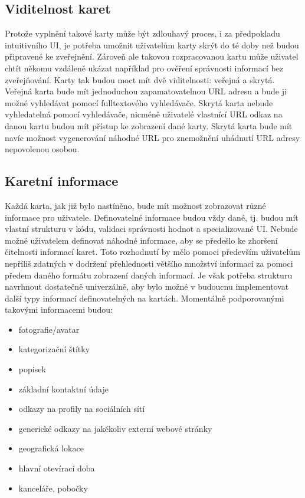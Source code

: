 	\subsection{Viditelnost karet}

	Protože vyplnění takové karty může být zdlouhavý proces, i za předpokladu intuitivního \ac{UI}, je potřeba umožnit
	uživatelům karty skrýt do té doby než budou připravené ke zveřejnění.
	Zároveň ale takovou rozpracovanou kartu může uživatel chtít někomu vzdáleně ukázat například pro ověření správnosti informací
	bez zveřejňování.
	Karty tak budou moct mít dvě viditelnosti: veřejná a skrytá.
	Veřejná karta bude mít jednoduchou zapamatovatelnou \ac{URL} adresu a bude ji možné vyhledávat pomocí fulltextového vyhledávače.
	Skrytá karta nebude vyhledatelná pomocí vyhledávače, nicméně uživatelé vlastnící \ac{URL} odkaz na danou kartu budou mít přístup
	ke zobrazení dané karty.
	Skrytá karta bude mít navíc možnost vygenerování náhodné \ac{URL} pro znemožnění uhádnutí \ac{URL} adresy nepovolenou osobou.

	\subsection{Karetní informace}

	Každá karta, jak již bylo nastíněno, bude mít možnost zobrazovat různé informace pro uživatele.
	Definovatelné informace budou vždy dané, tj. budou mít vlastní strukturu v kódu, validaci správnosti hodnot a specializované
	\ac{UI}.
	Nebude možné uživatelem definovat náhodné informace, aby se předešlo ke zhoršení čitelnosti informací karet.
	Toto rozhodnutí by mělo pomoci především uživatelům nepříliš zdatných v dodržení přehlednosti většího množství
	informací za pomoci předem daného formátu zobrazení daných informací.
	Je však potřeba strukturu navrhnout dostatečně univerzálně, aby bylo možné v budoucnu implementovat další typy informací
	definovatelných na kartách.
	Momentálně podporovanými takovými informacemi budou:
	\begin{itemize}
		\item fotografie/avatar
		\item kategorizační štítky
		\item popisek
		\item základní kontaktní údaje
		\item odkazy na profily na sociálních sítí
		\item generické odkazy na jakékoliv externí webové stránky
		\item geografická lokace
		\item hlavní otevírací doba
		\item kanceláře, pobočky
	\end{itemize}


